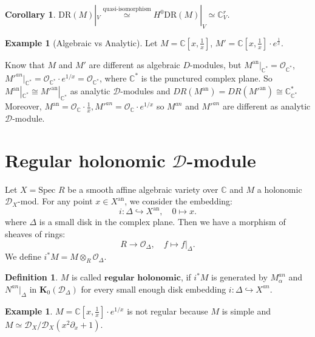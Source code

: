 \documentclass[openany]{book}
\newtheorem{corollary}[theorem]{Corollary}   %
\theoremstyle{definition} %
\newtheorem{definition}[theorem]{Definition} %
\newtheorem{example}[theorem]{Example}       %
\theoremstyle{remark}
\begin{document}
\begin{corollary}
    $\mathrm{DR}(M)|_{V}\stackrel{\text{quasi-isomorphism}}{\simeq}H^{0}\mathrm{DR}(M)|_{V}\simeq \mathbb{C}^{r}_{V}$.
\end{corollary}
\begin{example}[Algebraic vs Analytic]
    Let $M = \mathbb{C}[x, \frac{1}{x}]$, $M' = \mathbb{C}[x, \frac{1}{x}] \cdot e^{\frac{1}{x}}$.

    Know that $M$ and $M'$ are different as algebraic $D$-modules, but $M^{\text{an}}|_{\mathbb{C}^*} = \mathcal{O}_{\mathbb{C}^*}$, $M'^{an}|_{\mathbb{C}^{\ast}}=\mathcal{O}_{\mathbb{C}^{\ast}}\cdot e^{1/x}=\mathcal{O}_{\mathbb{C}^{\ast}}$, where $\mathbb{C}^{\ast}$ is the punctured complex plane. So $M^{\text{an}}|_{\mathbb{C}^*} \cong M'^{\text{an}}|_{\mathbb{C}^*}$ as analytic $\mathcal{D}$-modules and $DR(M^{\text{an}}) = DR(M'^{\text{an}}) \cong \mathbb{C}_{\mathbb{C}^*}^*$ Moreover, $M^{\text{an}} = \mathcal{O}_{\mathbb{C}}\cdot \frac{1}{x},M'^{an}=\mathcal{O}_{\mathbb{C}}\cdot e^{1/x}$ so $M^{an}$ and $M'^{an}$ are different as analytic $\mathcal{D}$-module.
\end{example}

\section{Regular holonomic $\mathcal{D}$-module}

Let $X = \text{Spec } R$ be a smooth affine algebraic variety over $\mathbb{C}$ and $M$ a holonomic $\mathcal{D}_X$-mod.
For any point $x \in X^{\text{an}}$, we consider the embedding:$$
    i: \Delta \hookrightarrow X^{\text{an}}, \quad 0 \mapsto x.
$$where $\Delta$ is a small disk in the complex plane.
Then we have a morphism of sheaves of rings:$$R \to \mathcal{O}_{\Delta}, \quad f \mapsto f|_{\Delta}.$$We define $i^*M = M \otimes_R \mathcal{O}_{\Delta}$.
\begin{definition}
    $M$ is called $\textbf{regular holonomic}$, if $i^{\ast}M$ is generated by $M_{\alpha}^{an}$ and $N^{an}|_{\Delta}$ in $\mathbf{K}_{0}(\mathcal{D}_{\Delta})$ for every small enough disk embedding $i:\Delta \hookrightarrow X^{an}$.
\end{definition}

\begin{example}
    $M=\mathbb{C}\left[ x, \frac{1}{x} \right]\cdot e^{1/x}$ is not regular because $M$ is simple and $M\simeq \mathcal{D}_{X} /\mathcal{D}_{X}(x^{2}\partial_{x}+1)$.
\end{example}
\end{document}

